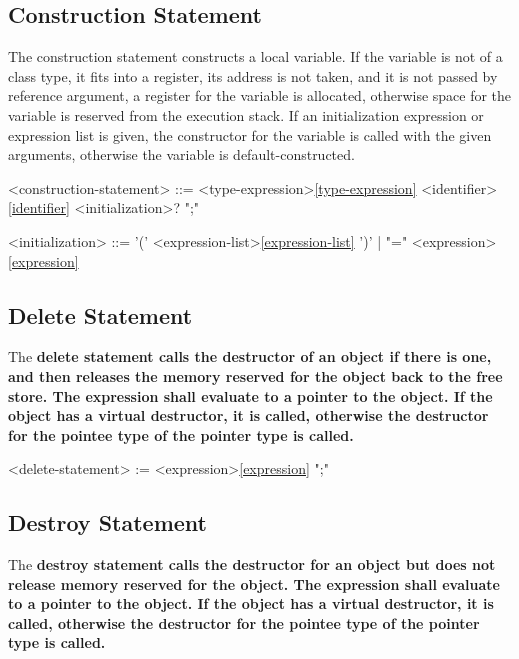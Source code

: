 \documentclass[a4paper,oneside,11pt]{article}
\begin{document}
\subsection{Construction Statement}

The construction statement constructs a local variable.
If the variable is not of a class type, it fits into a register, its address is not taken,
and it is not passed by reference argument, a register for the variable is allocated,
otherwise space for the variable is reserved from the execution stack.
If an initialization expression or expression list is given, the constructor for the variable is called with the given arguments,
otherwise the variable is default-constructed.

\begin{grammar}
\label{construction-statement}<construction-statement> ::= <type-expression>\ref{type-expression} <identifier>\ref{identifier} <initialization>? ";"

<initialization> ::= '(' <expression-list>\ref{expression-list} ')' | "=" <expression>\ref{expression}
\end{grammar}

\subsection{Delete Statement}

The \bf{delete} statement calls the destructor of an object if there is one, and then releases the memory reserved for the object back to the free store.
The expression shall evaluate to a pointer to the object.
If the object has a virtual destructor, it is called, otherwise the destructor for the pointee type of the pointer type is called.

\begin{grammar}
\label{delete-statement}<delete-statement> :=  <expression>\ref{expression} ";"
\end{grammar}

\subsection{Destroy Statement}

The \bf{destroy} statement calls the destructor for an object but does not release memory reserved for the object.
The expression shall evaluate to a pointer to the object.
If the object has a virtual destructor, it is called, otherwise the destructor for the pointee type of the pointer type is called.
\end{document}

